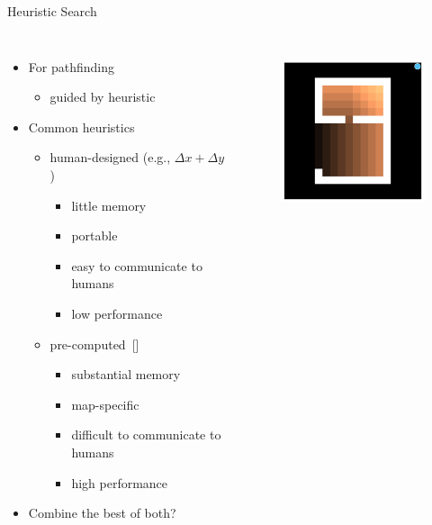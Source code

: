 \documentclass[aspectratio=169,usenames,dvipsnames]{beamer}
\newcommand{\tcg}[1]{\textcolor{m5}{#1}}
\newcommand{\tcm}[1]{\textcolor{m7}{#1}}
\newcommand{\bei}{\begin{itemize}}
\newcommand{\eei}{\end{itemize}}
\newcommand{\ie}{\item}
\numberwithin{equation}{section}
\numberwithin{theorem}{section}
\numberwithin{lem}{section}
\numberwithin{df}{section}
\begin{document}
\begin{frame}{Heuristic Search}

\begin{columns}


\bei

\ie For pathfinding%

\bei

\ie guided by heuristic

\eei

\medskip

\ie Common heuristics 

\bei

\ie human-designed (e.g., $\Delta x + \Delta y$)

\bei

\ie \tcg{little memory}

\ie \tcg{portable}

\ie \tcg{easy to communicate to humans}

\ie \tcm{low performance}

\eei

\ie pre-computed~[\cite{conf/ijcai/SturtevantFBSB09}]

\bei

\ie \tcm{substantial memory}

\ie \tcm{map-specific}

\ie \tcm{difficult to communicate to humans}

\ie \tcg{high performance}

\eei

\eei 

\medskip

\ie Combine the \tcg{best} of both?

\eei

\begin{figure}[tbp]
\centering
\includegraphics[height=5cm]{figs/mce.png}
\end{figure}
\end{columns} 



\end{frame}
\end{document}
